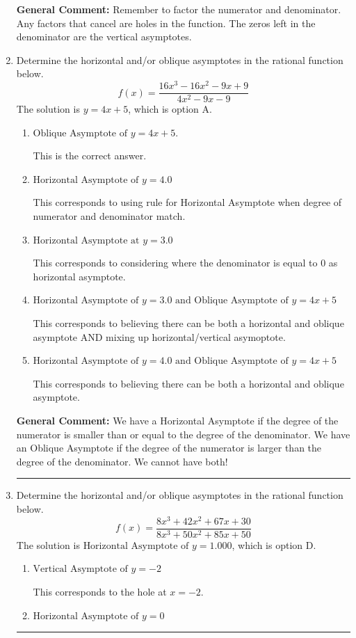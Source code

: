 \documentclass{extbook}[14pt]
\newcommand{\litem}[1]{\item #1

\rule{\textwidth}{0.4pt}}
\begin{document}
\begin{enumerate}
{\textbf{General Comment:} Remember to factor the numerator and denominator. Any factors that cancel are holes in the function. The zeros left in the denominator are the vertical asymptotes.
}
\litem{
Determine the horizontal and/or oblique asymptotes in the rational function below.
\[ f(x) = \frac{16x^{3} -16 x^{2} -9 x + 9}{4x^{2} -9 x -9} \]The solution is \( y = 4x + 5 \), which is option A.\begin{enumerate}[label=\Alph*.]
\item \( \text{Oblique Asymptote of } y = 4x + 5. \)

This is the correct answer.
\item \( \text{Horizontal Asymptote of } y = 4.0  \)

This corresponds to using rule for Horizontal Asymptote when degree of numerator and denominator match.
\item \( \text{Horizontal Asymptote at } y = 3.0 \)

This corresponds to considering where the denominator is equal to 0 as horizontal asymptote.
\item \( \text{Horizontal Asymptote of } y = 3.0 \text{ and Oblique Asymptote of } y = 4x + 5 \)

This corresponds to believing there can be both a horizontal and oblique asymptote AND mixing up horizontal/vertical asymoptote.
\item \( \text{Horizontal Asymptote of } y = 4.0 \text{ and Oblique Asymptote of } y = 4x + 5 \)

This corresponds to believing there can be both a horizontal and oblique asymptote.
\end{enumerate}

\textbf{General Comment:} We have a Horizontal Asymptote if the degree of the numerator is smaller than or equal to the degree of the denominator. We have an Oblique Asymptote if the degree of the numerator is larger than the degree of the denominator. We cannot have both!
}
\litem{
Determine the horizontal and/or oblique asymptotes in the rational function below.
\[ f(x) = \frac{8x^{3} +42 x^{2} +67 x + 30}{8x^{3} +50 x^{2} +85 x + 50} \]The solution is \( \text{Horizontal Asymptote of } y = 1.000  \), which is option D.\begin{enumerate}[label=\Alph*.]
\item \( \text{Vertical Asymptote of } y = -2  \)

This corresponds to the hole at $x = -2$.
\item \( \text{Horizontal Asymptote of } y = 0  \)


\end{enumerate}}
\end{enumerate}
\end{document}
